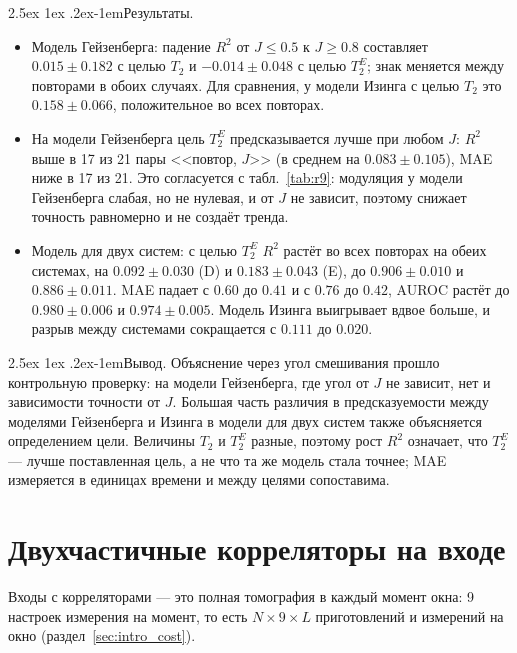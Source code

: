 \documentclass[12pt,a4paper]{report}
\makeatletter
\renewcommand\paragraph{\@startsection{paragraph}{4}{\z@}%
  {2.5ex \@plus1ex \@minus.2ex}{-1em}{\normalfont\normalsize\bfseries}}
\numberwithin{equation}{chapter}
\makeatother
\begin{document}
\paragraph{Результаты.}
\begin{itemize}
\item Модель Гейзенберга: падение $R^2$ от $J\le0.5$ к $J\ge0.8$ составляет
      $0.015\pm0.182$ с целью $T_2$ и $-0.014\pm0.048$ с целью $T_2^E$; знак
      меняется между повторами в обоих случаях. Для сравнения, у модели
      Изинга с целью $T_2$ это $0.158\pm0.066$, положительное во всех
      повторах.
\item На модели Гейзенберга цель $T_2^E$ предсказывается лучше при любом
      $J$: $R^2$ выше в 17 из 21 пары <<повтор, $J$>> (в среднем на
      $0.083\pm0.105$), MAE ниже в 17 из 21. Это согласуется с
      табл.~\ref{tab:r9}: модуляция у модели Гейзенберга слабая, но не
      нулевая, и от $J$ не зависит, поэтому снижает точность равномерно и
      не создаёт тренда.
\item Модель для двух систем: с целью $T_2^E$ $R^2$ растёт во всех повторах
      на обеих системах, на $0.092\pm0.030$ (D) и $0.183\pm0.043$ (E), до
      $0.906\pm0.010$ и $0.886\pm0.011$. MAE падает с $0.60$ до $0.41$ и с
      $0.76$ до $0.42$, AUROC растёт до $0.980\pm0.006$ и $0.974\pm0.005$.
      Модель Изинга выигрывает вдвое больше, и разрыв между системами
      сокращается с $0.111$ до $0.020$.
\end{itemize}

\paragraph{Вывод.} Объяснение через угол смешивания прошло контрольную
проверку: на модели Гейзенберга, где угол от $J$ не зависит, нет и
зависимости точности от $J$. Большая часть различия в предсказуемости между
моделями Гейзенберга и Изинга в модели для двух систем также объясняется
определением цели. Величины $T_2$ и $T_2^E$ разные, поэтому рост $R^2$
означает, что $T_2^E$ --- лучше поставленная цель, а не что та же модель
стала точнее; MAE измеряется в единицах времени и между целями сопоставима.

\section{Двухчастичные корреляторы на входе}
\label{sec:r23}

Входы с корреляторами --- это полная томография в каждый момент окна: 9
настроек измерения на момент, то есть $N\times9\times L$ приготовлений и
измерений на окно (раздел~\ref{sec:intro_cost}).
\end{document}
